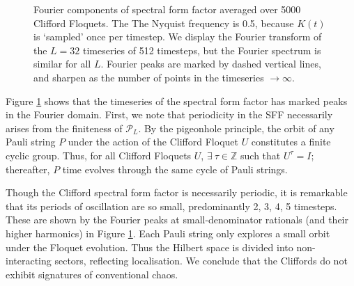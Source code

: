 \documentclass[10pt]{article}
\begin{document}

\begin{figure}
\centering
{}
\caption{Fourier components of spectral form factor averaged over 5000 Clifford Floquets. The The Nyquist frequency is 0.5, because $K(t)$ is `sampled' once per timestep. We display the Fourier transform of the $L=32$ timeseries of 512 timesteps, but the Fourier spectrum is similar for all $L$. Fourier peaks are marked by dashed vertical lines, and sharpen as the number of points in the timeseries $\rightarrow\infty$.}
\label{fig_sff_ft}
\end{figure}

Figure \ref{fig_sff_ft} shows that the timeseries of the spectral form factor has marked peaks in the Fourier domain. First, we note that periodicity in the SFF necessarily arises from the finiteness of $\mathcal{P}_L$. By the pigeonhole principle, the orbit of any Pauli string $P$ under the action of the Clifford Floquet $U$ constitutes a finite cyclic group. Thus, for all Clifford Floquets $U$, $\exists \ \tau \in \mathbb{Z}$ such that $U^\tau = I$; thereafter, $P$ time evolves through the same cycle of Pauli strings. 

Though the Clifford spectral form factor is necessarily periodic, it is remarkable that its periods of oscillation are so small, predominantly 2, 3, 4, 5 timesteps. These are shown by the Fourier peaks at small-denominator rationals (and their higher harmonics) in Figure \ref{fig_sff_ft}. Each Pauli string only explores a small orbit under the Floquet evolution. Thus the Hilbert space is divided into non-interacting sectors, reflecting localisation. We conclude that the Cliffords do not exhibit signatures of conventional chaos.
\end{document}
